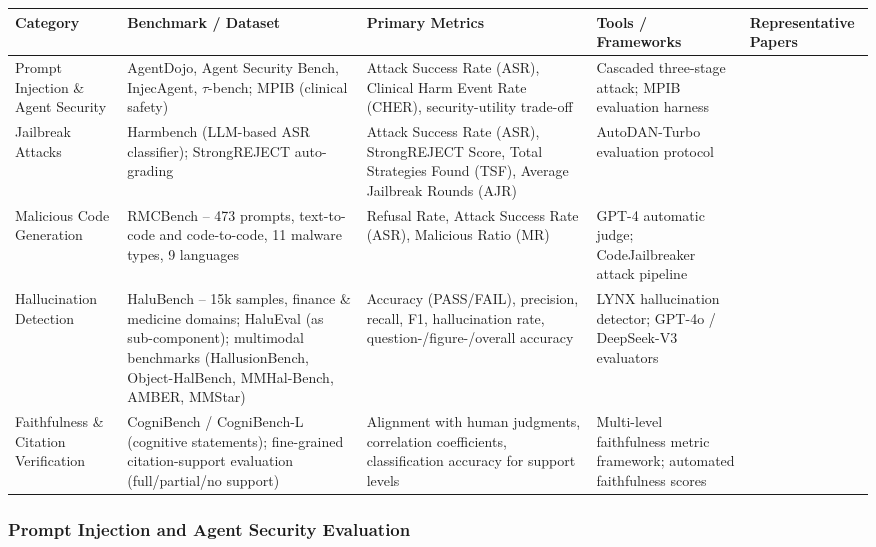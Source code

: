 \documentclass[11pt,a4paper]{article}
\begin{document}
\begin{table}[htbp]
\centering
\small
\begin{tabularx}{\textwidth}{@{}*{5}{>{\raggedright\arraybackslash}X}@{}}
\toprule
Category & Benchmark / Dataset & Primary Metrics & Tools / Frameworks & Representative Papers \\
\midrule
Prompt Injection \& Agent Security & AgentDojo, Agent Security Bench, InjecAgent, $\tau$-bench; MPIB (clinical safety) & Attack Success Rate (ASR), Clinical Harm Event Rate (CHER), security-utility trade-off & Cascaded three-stage attack; MPIB evaluation harness &  \\
Jailbreak Attacks & Harmbench (LLM-based ASR classifier); StrongREJECT auto-grading & Attack Success Rate (ASR), StrongREJECT Score, Total Strategies Found (TSF), Average Jailbreak Rounds (AJR) & AutoDAN-Turbo evaluation protocol & \cite{Liu_2024_LLMs_f40cf88b} \\
Malicious Code Generation & RMCBench -- 473 prompts, text-to-code and code-to-code, 11 malware types, 9 languages & Refusal Rate, Attack Success Rate (ASR), Malicious Ratio (MR) & GPT-4 automatic judge; CodeJailbreaker attack pipeline &  \\
Hallucination Detection & HaluBench -- 15k samples, finance \& medicine domains; HaluEval (as sub-component); multimodal benchmarks (HallusionBench, Object-HalBench, MMHal-Bench, AMBER, MMStar) & Accuracy (PASS/FAIL), precision, recall, F1, hallucination rate, question-/figure-/overall accuracy & LYNX hallucination detector; GPT-4o / DeepSeek-V3 evaluators &  \\
Faithfulness \& Citation Verification & CogniBench / CogniBench-L (cognitive statements); fine-grained citation-support evaluation (full/partial/no support) & Alignment with human judgments, correlation coefficients, classification accuracy for support levels & Multi-level faithfulness metric framework; automated faithfulness scores &  \\
\bottomrule
\end{tabularx}
\end{table}

\subsubsection{Prompt Injection and Agent Security Evaluation}
\end{document}
